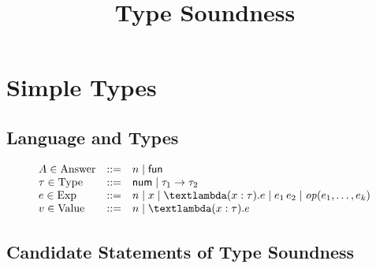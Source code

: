 \documentclass{article}
\title{Type Soundness}
\author{}
\date{}
\begin{document}
\maketitle

\section{Simple Types}
\subsection{Language and Types}

\[\begin{array}{lcl}
\NT{A}{Answer} \NTEq
    n \NTSep
    \LAFun
    \\
\NT{\Gt}{Type} \NTEq
    \TNum \NTSep
    \TArrow{\Gt_1}{\Gt_2}
    \\
\NT{e}{Exp} \NTEq
    n \NTSep
    x \NTSep
    \TFun{(\TAnn{x}{\Gt})}{e} \NTSep
    \TApp{e_1}{e_2} \NTSep
    \TOp{e_1,\dots,e_k}
    \\
\NT{v}{Value} \NTEq
    n \NTSep
    \TFun{(\TAnn{x}{\Gt})}{e}
\end{array}\]

\subsection{Candidate Statements of Type Soundness}
\end{document}
